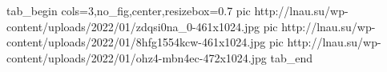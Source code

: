  
 
 
 
 


\ifcmt
  tab_begin cols=3,no_fig,center,resizebox=0.7
     pic http://lnau.su/wp-content/uploads/2022/01/zdqsi0na_0-461x1024.jpg
		 pic http://lnau.su/wp-content/uploads/2022/01/8hfg1554kcw-461x1024.jpg
		 pic http://lnau.su/wp-content/uploads/2022/01/ohz4-mbn4ec-472x1024.jpg
  tab_end
\fi
